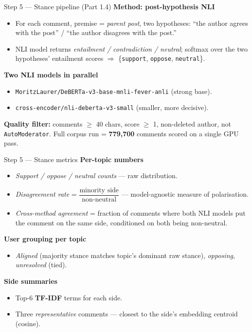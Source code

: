\documentclass[10pt,aspectratio=169]{beamer}
\begin{document}
\begin{frame}{Step 5 — Stance pipeline (Part 1.4)}
\textbf{Method: post-hypothesis NLI}
\begin{itemize}
  \item For each comment, premise = \emph{parent post}, two hypotheses:
        ``the author agrees with the post'' / ``the author disagrees with the post.''
  \item NLI model returns \emph{entailment / contradiction / neutral}; softmax over the two hypotheses' entailment scores $\Rightarrow$ \{\texttt{support}, \texttt{oppose}, \texttt{neutral}\}.
\end{itemize}

\medskip
\textbf{Two NLI models in parallel}
\begin{itemize}
  \item \texttt{MoritzLaurer/DeBERTa-v3-base-mnli-fever-anli} (strong base).
  \item \texttt{cross-encoder/nli-deberta-v3-small} (smaller, more decisive).
\end{itemize}

\medskip
\textbf{Quality filter:} comments $\geq$ 40 chars, score $\geq$ 1, non-deleted author, not \texttt{AutoModerator}. Full corpus run = \textbf{779{,}700} comments scored on a single GPU pass.
\end{frame}

\begin{frame}{Step 5 — Stance metrics}
\textbf{Per-topic numbers}
\begin{itemize}
  \item \emph{Support / oppose / neutral counts} — raw distribution.
  \item \emph{Disagreement rate} = $\dfrac{\text{minority side}}{\text{non-neutral}}$ — model-agnostic measure of polarisation.
  \item \emph{Cross-method agreement} = fraction of comments where both NLI models put the comment on the same side, conditioned on both being non-neutral.
\end{itemize}

\medskip
\textbf{User grouping per topic}
\begin{itemize}
  \item \emph{Aligned} (majority stance matches topic's dominant raw stance), \emph{opposing}, \emph{unresolved} (tied).
\end{itemize}

\medskip
\textbf{Side summaries}
\begin{itemize}
  \item Top-6 \textbf{TF-IDF} terms for each side.
  \item Three \emph{representative} comments — closest to the side's embedding centroid (cosine).
\end{itemize}
\end{frame}
\end{document}
